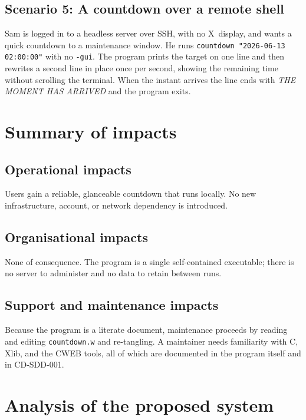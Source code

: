 \documentclass[12pt]{article}
\newcommand{\code}[1]{\texttt{#1}}
\begin{document}
\subsection{Scenario 5: A countdown over a remote shell}

Sam is logged in to a headless server over SSH, with no X~display, and
wants a quick countdown to a maintenance window.  He runs
\code{countdown "2026-06-13 02:00:00"} with no \code{-gui}.  The program
prints the target on one line and then rewrites a second line in place
once per second, showing the remaining time without scrolling the
terminal.  When the instant arrives the line ends with \emph{THE MOMENT
HAS ARRIVED} and the program exits.

\section{Summary of impacts}

\subsection{Operational impacts}

Users gain a reliable, glanceable countdown that runs locally.  No new
infrastructure, account, or network dependency is introduced.

\subsection{Organisational impacts}

None of consequence.  The program is a single self-contained executable;
there is no server to administer and no data to retain between runs.

\subsection{Support and maintenance impacts}

Because the program is a literate document, maintenance proceeds by
reading and editing \code{countdown.w} and re-tangling.  A maintainer
needs familiarity with C, Xlib, and the CWEB tools, all of which are
documented in the program itself and in CD-SDD-001.

\section{Analysis of the proposed system}
\end{document}
